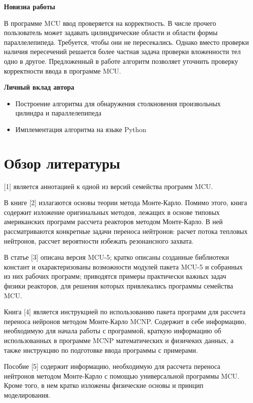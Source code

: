 \documentclass[pdftex,ptm,12pt,a4paper]{report}
\begin{document}
      \textbf{Новизна работы}

        В программе MCU ввод проверяется на корректность.
        В числе прочего пользователь может задавать цилиндрические области и области формы параллелепипеда.
        Требуется, чтобы они не пересекались.
        Однако вместо проверки наличия пересечений решается более частная задача проверки вложенности тел одно в другое.
        Предложенный в работе алгоритм позволяет уточнить проверку корректности ввода в программе MCU.

      \textbf{Личный вклад автора}

        \begin{itemize}
          \item Построение алгоритма для обнаружения столкновения произвольных цилиндра и параллелепипеда
          \item Имплементация алгоритма на языке Python
        \end{itemize}

    \section{Обзор литературы}
      [1] является аннотацией к одной из версий семейства программ MCU.

      В книге [2] излагаются основы теории метода Монте-Карло.
      Помимо этого, книга содержит изложение оригинальных методов, лежащих в основе типовых американских программ рассчета реакторов методом Монте-Карло.
      В ней рассматриваются конкретные задачи переноса нейтронов: расчет потока тепловых нейтронов, рассчет вероятности избежать резонансного захвата.

      В статье [3] описана версия MCU-5; кратко описаны созданные библиотеки констант и охарактеризованы возможности модулей пакета MCU-5 и собранных из них рабочих программ; приводятся примеры практически важных задач физики реакторов, для решения которых привлекались программы семейства MCU.

      Книга [4] является инструкцией по использованию пакета программ для рассчета переноса нейронов методом
      Монте-Карло MCNP. Содержит в себе информацию, необходимую для начала работы с программой, краткую информацию
      об использованных в программе MCNP математических и физичеких данных, а также инструкцию по подготовке
      ввода программы с примерами.

      Пособие [5] содержит информацию, необходимую для рассчета переноса нейтронов методом Монте-Карло
      с помощью универсальной программы MCU. Кроме того, в нем кратко изложены физические основы и принцип моделирования.
\end{document}
